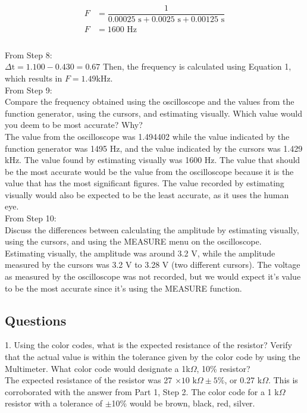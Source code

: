 \documentclass [12pt, letterpaper, twoside] {article}
\begin{document}
\begin{equation*}
  \begin{split}
    F &= \dfrac{1}{0.00025{\text{ s}}+ 0.0025{\text{ s}} + 0.00125{\text{ s}}} \\
    F &= 1600 \text{ Hz}\\
  \end{split}
\end{equation*} \\

\noindent
From Step 8: \\
\(\Delta\text{t} = 1.100 - 0.430 = 0.67\)
Then, the frequency is calculated using Equation 1, which results in \(F = 1.49\)kHz. \\

\noindent
From Step 9: \\
Compare the frequency obtained using the oscilloscope and the values from the function generator, using the cursors, and estimating visually. Which value would you deem to be most accurate? Why? \\
The value from the oscilloscope was 1.494402 while the value indicated by the function generator was 1495 Hz, and the value indicated by the cursors was 1.429 kHz. The value found by estimating visually was 1600 Hz. The value that should be the most accurate would be the value from the oscilloscope because it is the value that has the most significant figures. The value recorded by estimating visually would also be expected to be the least accurate, as it uses the human eye. \\

\noindent
From Step 10: \\
Discuss the differences between calculating the amplitude by estimating visually, using the cursors, and using the MEASURE menu on the oscilloscope. \\
Estimating visually, the amplitude was around 3.2 V, while the amplitude measured by the cursors was 3.2 V to 3.28 V (two different cursors). The voltage as measured by the oscilloscope was not recorded, but we would expect it's value to be the most accurate since it's using the MEASURE function.


\subsection*{Questions}
1. Using the color codes, what is the expected resistance of the resistor? Verify that the actual value is  within  the  tolerance  given  by  the  color  code  by  using  the  Multimeter. What  color  code  would designate a 1k\(\Omega\), 10\% resistor? \\
The expected resistance of the resistor was 27 \(\times{10}\text{ k}\Omega\pm{5}\%\), or 0.27 k\(\Omega\). This is corroborated with the answer from Part 1, Step 2. The color code for a 1 k\(\Omega\) resistor with a tolerance of \(\pm\)10\% would be brown, black, red, silver. \\
\end{document}
